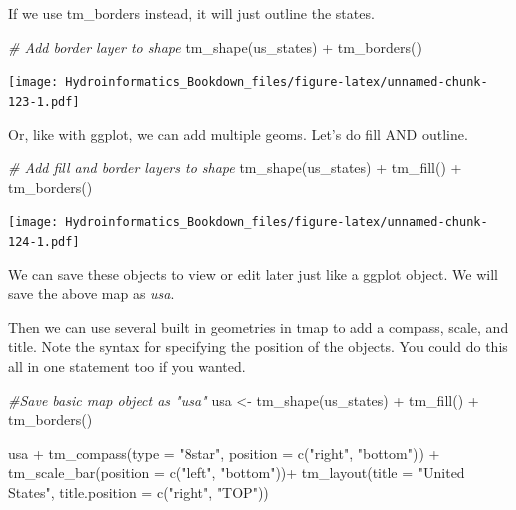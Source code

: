 \documentclass[
]{book}
\newenvironment{Shaded}{\begin{snugshade}}{\end{snugshade}}
\newcommand{\AttributeTok}[1]{\textcolor[rgb]{0.77,0.63,0.00}{#1}}
\newcommand{\CommentTok}[1]{\textcolor[rgb]{0.56,0.35,0.01}{\textit{#1}}}
\newcommand{\FunctionTok}[1]{\textcolor[rgb]{0.00,0.00,0.00}{#1}}
\newcommand{\NormalTok}[1]{#1}
\newcommand{\OtherTok}[1]{\textcolor[rgb]{0.56,0.35,0.01}{#1}}
\newcommand{\SpecialCharTok}[1]{\textcolor[rgb]{0.00,0.00,0.00}{#1}}
\newcommand{\StringTok}[1]{\textcolor[rgb]{0.31,0.60,0.02}{#1}}
\begin{document}
If we use tm\_borders instead, it will just outline the states.

\begin{Shaded}
\begin{Highlighting}[]
\CommentTok{\# Add border layer to shape}
\FunctionTok{tm\_shape}\NormalTok{(us\_states) }\SpecialCharTok{+}
  \FunctionTok{tm\_borders}\NormalTok{() }
\end{Highlighting}
\end{Shaded}

\texttt{[image: Hydroinformatics\_Bookdown\_files/figure-latex/unnamed-chunk-123-1.pdf]}

Or, like with ggplot, we can add multiple geoms. Let's do fill AND outline.

\begin{Shaded}
\begin{Highlighting}[]
\CommentTok{\# Add fill and border layers to shape}
\FunctionTok{tm\_shape}\NormalTok{(us\_states) }\SpecialCharTok{+}
  \FunctionTok{tm\_fill}\NormalTok{() }\SpecialCharTok{+}
  \FunctionTok{tm\_borders}\NormalTok{()}
\end{Highlighting}
\end{Shaded}

\texttt{[image: Hydroinformatics\_Bookdown\_files/figure-latex/unnamed-chunk-124-1.pdf]}

We can save these objects to view or edit later just like a ggplot object. We will save the above map as \emph{usa}.

Then we can use several built in geometries in tmap to add a compass, scale, and title. Note the syntax for specifying the position of the objects. You could do this all in one statement too if you wanted.

\begin{Shaded}
\begin{Highlighting}[]
\CommentTok{\#Save basic map object as "usa"}
\NormalTok{usa }\OtherTok{\textless{}{-}} \FunctionTok{tm\_shape}\NormalTok{(us\_states) }\SpecialCharTok{+}
  \FunctionTok{tm\_fill}\NormalTok{() }\SpecialCharTok{+}
  \FunctionTok{tm\_borders}\NormalTok{()}

\NormalTok{usa }\SpecialCharTok{+} 
  \FunctionTok{tm\_compass}\NormalTok{(}\AttributeTok{type =} \StringTok{"8star"}\NormalTok{, }\AttributeTok{position =} \FunctionTok{c}\NormalTok{(}\StringTok{"right"}\NormalTok{, }\StringTok{"bottom"}\NormalTok{)) }\SpecialCharTok{+}
  \FunctionTok{tm\_scale\_bar}\NormalTok{(}\AttributeTok{position =} \FunctionTok{c}\NormalTok{(}\StringTok{"left"}\NormalTok{, }\StringTok{"bottom"}\NormalTok{))}\SpecialCharTok{+}
  \FunctionTok{tm\_layout}\NormalTok{(}\AttributeTok{title =} \StringTok{"United States"}\NormalTok{, }\AttributeTok{title.position =} \FunctionTok{c}\NormalTok{(}\StringTok{"right"}\NormalTok{, }\StringTok{"TOP"}\NormalTok{))}
\end{Highlighting}
\end{Shaded}
\end{document}
